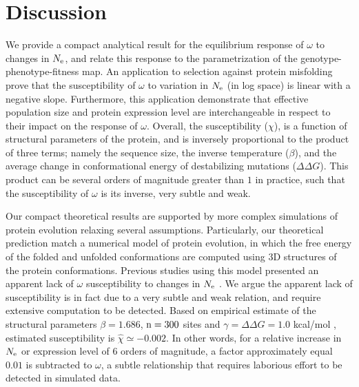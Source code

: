 \section{Discussion}

We provide a compact analytical result for the equilibrium response of $\omega$ to changes in $N_{\mathrm{e}}$, and relate this response to the parametrization of the genotype-phenotype-fitness map.
An application to selection against protein misfolding prove that the susceptibility of $\omega$ to variation in $N_{\mathrm{e}}$ (in log space) is linear with a negative slope.
Furthermore, this application demonstrate that effective population size and protein expression level are interchangeable in respect to their impact on the response of $\omega$.
Overall, the susceptibility ($\chi$), is a function of structural parameters of the protein, and is inversely proportional to the product of three terms; namely the sequence size, the inverse temperature ($\beta$), and the average change in conformational energy of destabilizing mutations ($\Delta \Delta G$). 
This product can be several orders of magnitude greater than $1$ in practice, such that the susceptibility of $\omega$ is its inverse, very subtle and weak. 


Our compact theoretical results are supported by more complex simulations of protein evolution relaxing several assumptions.
Particularly, our theoretical prediction match a numerical model of protein evolution, in which the free energy of the folded and unfolded conformations are computed using $3$D structures of the protein conformations.
Previous studies using this model presented an apparent lack of $\omega$ susceptibility to changes in $N_{\mathrm{e}}$ \citep{Goldstein2013}.
We argue the apparent lack of susceptibility is in fact due to a very subtle and weak relation, and require extensive computation to be detected.
Based on empirical estimate of the structural parameters $\beta = 1.686$, $\text{n}=300$ sites and $\gamma=\Delta \Delta G = 1.0$ kcal/mol \citep{Zeldovich2007}, estimated susceptibility is $\hat{\chi} \simeq -0.002$.
In other words, for a relative increase in $N_{\mathrm{e}}$ or expression level of $6$ orders of magnitude, a factor approximately equal $0.01$ is subtracted to $\omega$, a subtle relationship that requires laborious effort to be detected in simulated data.

